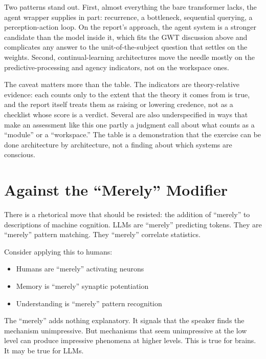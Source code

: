 \documentclass[11pt,letterpaper]{article}
\begin{document}
Two patterns stand out. First, almost everything the bare transformer lacks, the agent wrapper supplies in part: recurrence, a bottleneck, sequential querying, a perception-action loop. On the report's approach, the agent system is a stronger candidate than the model inside it, which fits the GWT discussion above and complicates any answer to the unit-of-the-subject question that settles on the weights. Second, continual-learning architectures move the needle mostly on the predictive-processing and agency indicators, not on the workspace ones.

\begin{keybox}
The caveat matters more than the table. The indicators are theory-relative evidence: each counts only to the extent that the theory it comes from is true, and the report itself treats them as raising or lowering credence, not as a checklist whose score is a verdict. Several are also underspecified in ways that make an assessment like this one partly a judgment call about what counts as a ``module'' or a ``workspace.'' The table is a demonstration that the exercise can be done architecture by architecture, not a finding about which systems are conscious.
\end{keybox}

\section{Against the ``Merely'' Modifier}

There is a rhetorical move that should be resisted: the addition of ``merely'' to descriptions of machine cognition. LLMs are ``merely'' predicting tokens. They are ``merely'' pattern matching. They ``merely'' correlate statistics.

Consider applying this to humans:
\begin{itemize}
  \item Humans are ``merely'' activating neurons
  \item Memory is ``merely'' synaptic potentiation
  \item Understanding is ``merely'' pattern recognition
\end{itemize}

The ``merely'' adds nothing explanatory. It signals that the speaker finds the mechanism unimpressive. But mechanisms that seem unimpressive at the low level can produce impressive phenomena at higher levels. This is true for brains. It may be true for LLMs.
\end{document}

